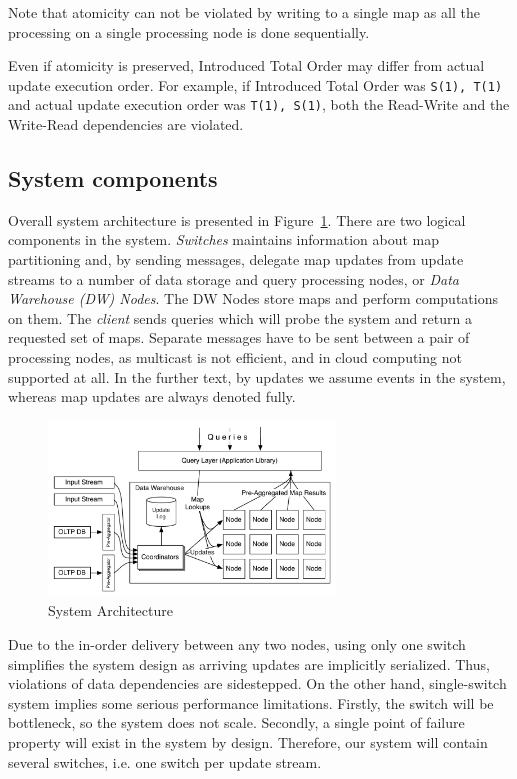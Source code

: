 \documentclass{sig-semester}
\def\EXORD{actual update execution order\xspace}
\begin{document}
Note that atomicity can not be violated by writing to a single map as all the processing on a single processing node is done sequentially.

Even if atomicity is preserved, Introduced Total Order may differ from \EXORD. For example, if Introduced Total Order was \texttt{S(1), T(1)} and \EXORD was \texttt{T(1), S(1)}, both the Read-Write and the Write-Read dependencies are violated.

\subsection{System components}
\label{Components}
\vspace{2mm}

Overall system architecture is presented in Figure~\ref{fig:architecture}. There are two logical components in the system.
\textit{Switches} maintains information about map partitioning and, by sending messages, delegate map updates from update streams to a number of data storage and query processing nodes, or \textit{Data Warehouse (DW) Nodes}. The DW Nodes store maps and perform computations on them. The \textit{client} sends queries which will probe the system and return a requested set of maps. Separate messages have to be sent between a pair of processing nodes, as multicast is not efficient, and in cloud computing not supported at all. In the further text, by updates we assume events in the system, whereas map updates are always denoted fully.

\begin{figure}
\includegraphics[width=3in]{Architecture.pdf}
\vspace{-3mm}
\caption{System Architecture}
\label{fig:architecture}
\vspace{-2mm}
\end{figure}

Due to the in-order delivery between any two nodes, using only one switch simplifies the system design as arriving updates are implicitly serialized. Thus, violations of data dependencies are sidestepped. On the other hand, single-switch system implies some serious performance limitations. Firstly, the switch will be bottleneck, so the system does not scale. Secondly, a single point of failure property will exist in the system by design. Therefore, our system will contain several switches, i.e. one switch per update stream.
\end{document}
